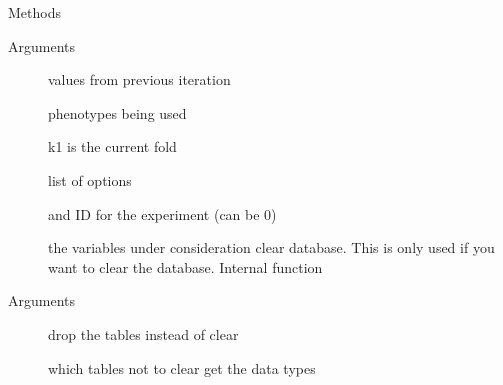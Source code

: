 \documentclass[letterpaper]{book}
\begin{document}
\begin{Section}{Methods}
\begin{SubSection}{}
%
\begin{SubSubSection}{Arguments}

\begin{description}

\item[] values from previous iteration
\item[] phenotypes being used
\item[] k1 is the current fold
\item[] list of options
\item[] and ID for the experiment (can be 0)
\item[] the variables under consideration
clear database. This is only used if you want to clear the database.  Internal function

\end{description}



\end{SubSubSection}

\end{SubSection}




\hypertarget{method-dataH-clear_db}{}
%
\begin{SubSection}{}
%

%
\begin{SubSubSection}{Arguments}

\begin{description}

\item[] drop the tables instead of clear
\item[] which tables not to clear
get the data types

\end{description}



\end{SubSubSection}

\end{SubSection}





\end{Section}
\end{document}
